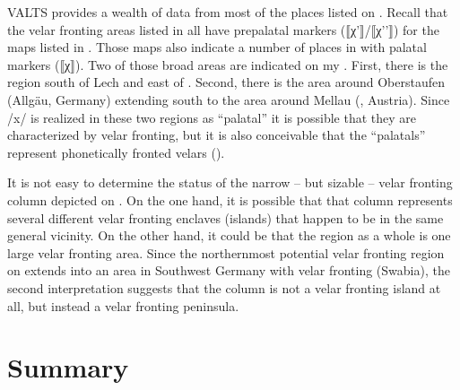 VALTS provides a wealth of data from most of the places listed on . Recall that the velar fronting areas listed in  all have prepalatal markers (⟦χ'⟧/⟦χ'{}'⟧) for the maps listed in . Those maps also indicate a number of places in  with palatal markers (⟦χ⟧). Two of those broad areas are indicated on my . First, there is the region south of Lech and east of . Second, there is the area around Oberstaufen (Allgäu, Germany) extending south to the area around Mellau (, Austria). Since /x/ is realized in these two regions as “palatal” it is possible that they are characterized by velar fronting, but it is also conceivable that the “palatals” represent phonetically fronted velars ().

It is not easy to determine the status of the narrow -- but sizable -- velar fronting column depicted on . On the one hand, it is possible that that column represents several different velar fronting enclaves (islands) that happen to be in the same general vicinity. On the other hand, it could be that the region as a whole is one large velar fronting area. Since the northernmost potential velar fronting region on  extends into an area in Southwest Germany with velar fronting (Swabia), the second interpretation suggests that the column is not a velar fronting island at all, but instead a velar fronting peninsula.

\section{{Summary}}\label{sec:15.12}

